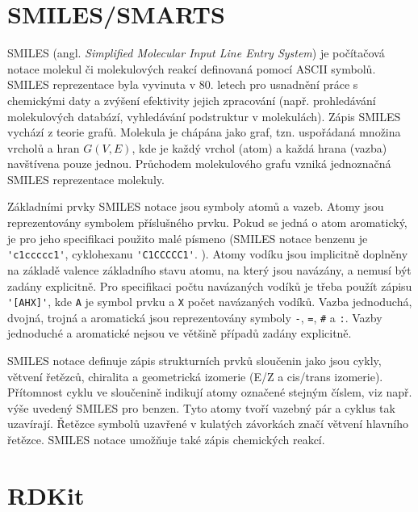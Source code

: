\section{SMILES/SMARTS}
SMILES (angl. \textit{Simplified Molecular Input Line Entry System}) je počítačová notace molekul či molekulových reakcí definovaná pomocí ASCII symbolů. SMILES reprezentace byla vyvinuta v 80. letech pro usnadnění práce s chemickými daty  a zvýšení efektivity jejich zpracování (např. prohledávání molekulových databází, vyhledávání podstruktur v molekulách). Zápis SMILES vychází z teorie grafů. Molekula je chápána jako graf, tzn. uspořádaná množina vrcholů a hran $G(V,E)$, kde je každý vrchol (atom) a každá hrana (vazba) navštívena pouze jednou. Průchodem molekulového grafu vzniká jednoznačná SMILES reprezentace molekuly.

Základními prvky SMILES notace jsou symboly atomů a vazeb. Atomy jsou reprezentovány symbolem příslušného prvku. Pokud se jedná o atom aromatický, je pro jeho specifikaci použito malé písmeno (SMILES notace benzenu je \verb|'c1ccccc1'|, cyklohexanu \verb|'C1CCCCC1'|.
). Atomy vodíku jsou implicitně doplněny na základě valence základního stavu atomu, na který jsou navázány, a nemusí být  zadány explicitně. Pro specifikaci počtu navázaných vodíků je třeba použít zápisu \verb|'[AHX]'|, kde \verb|A| je symbol prvku a \verb|X| počet navázaných vodíků. Vazba jednoduchá, dvojná, trojná a aromatická jsou reprezentovány symboly \verb|-|, \verb|=|, \verb|#| a \verb|:|. Vazby jednoduché a aromatické nejsou ve většině případů zadány explicitně.

SMILES notace definuje zápis strukturních prvků sloučenin jako jsou cykly, větvení řetězců, chiralita a geometrická izomerie (E/Z a cis/trans izomerie). Přítomnost cyklu ve sloučenině indikují atomy označené stejným číslem, viz např. výše uvedený SMILES pro benzen. Tyto atomy tvoří vazebný pár a cyklus tak uzavírají. Řetězce symbolů uzavřené v kulatých závorkách značí větvení hlavního řetězce. SMILES notace  umožňuje také zápis chemických reakcí. 


\section{RDKit}
